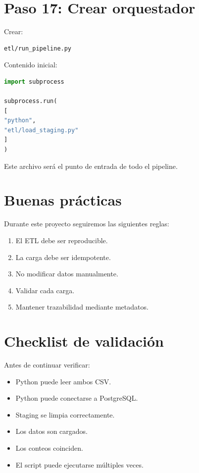 \section{Paso 17: Crear orquestador}

Crear:

\begin{verbatim}
etl/run_pipeline.py
\end{verbatim}

Contenido inicial:

\begin{lstlisting}[language=Python]
import subprocess

subprocess.run(
[
"python",
"etl/load_staging.py"
]
)
\end{lstlisting}

Este archivo será el punto de entrada de todo el pipeline.

\section{Buenas prácticas}

Durante este proyecto seguiremos las siguientes reglas:

\begin{enumerate}
\item El ETL debe ser reproducible.
\item La carga debe ser idempotente.
\item No modificar datos manualmente.
\item Validar cada carga.
\item Mantener trazabilidad mediante metadatos.
\end{enumerate}

\section{Checklist de validación}

Antes de continuar verificar:

\begin{itemize}
\item[$\Box$] Python puede leer ambos CSV.
\item[$\Box$] Python puede conectarse a PostgreSQL.
\item[$\Box$] Staging se limpia correctamente.
\item[$\Box$] Los datos son cargados.
\item[$\Box$] Los conteos coinciden.
\item[$\Box$] El script puede ejecutarse múltiples veces.
\end{itemize}

